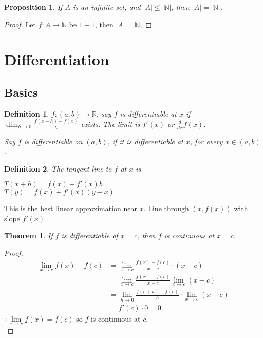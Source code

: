 \documentclass[12pt]{article}
\newcommand{\abs}[1]{\left| #1 \right|}
\theoremstyle{plain}
\newtheorem{theorem}{Theorem}[subsection]
\newtheorem{definition}{Definition}[subsection]
\newtheorem{proposition}{Proposition}[subsection]
\newcommand{\dlim}{\displaystyle\lim\limits}
\begin{document}
    \begin{proposition}
        If $A$ is an infinite set, and $\abs{A}\leq \abs{\mathbb{N}}$,
        then $\abs{A} = \abs{\mathbb{N}}$.
    \end{proposition}
    \begin{proof}
        Let $f:A\to\mathbb{N}$ be $1-1$, then $\abs{A}=\mathbb{N}$, 
    \end{proof}

    \newpage
\section{Differentiation}
    \subsection{Basics}
    \begin{definition}
        $f:(a,b)\to\mathbb{R}$, say  $f$ is differentiable at $x$ 
        if $\dim_{h\to 0} \frac{f(x+h)-f(x)}h$ exists. The limit is $f'(x)$
        or $\frac d{dx} f(x)$. 

        Say $f$ is differentiable on $(a,b)$, if it is differentiable at $x$,
         for every $x\in (a,b)$.\\
    \end{definition}
     
		\begin{definition}
			The tangent line to $f$ at $x$ is 
			\begin{center}
				$T(x+h) = f(x)+f'(x)h$\\
				$T(y) = f(x) + f'(x) (y-x)$
			\end{center}
		\end{definition}

    This is the best linear approximation near $x$. 
    Line through $(x, f(x))$ with slope $f'(x)$.\\

    \begin{theorem}
        If $f$ is differentiable of $x=c$, 
        then $f$ is continuous at $x=c$.
    \end{theorem}
     \begin{proof}
        \begin{align*}
				 \dlim_{x\to c} f(x)- f(c) 
					&= \dlim_{x\to c} \frac{f(x)-f(c)}{x-c}\cdot (x-c)\\
					&=\dlim_{x\to c} \frac{f(x)-f(c)}{x-c} \dlim_{x\to c}(x-c)\\
					&=\dlim_{h\to 0} \frac{f(c+h)-f(c)}h \cdot \dlim_{x\to c}(x-c)\\
					&=f'(c)\cdot 0 = 0
        \end{align*}
        $\therefore \dlim_{x\to c} f(x) = f(c)$ so $f$ is continuous at $c$. \\
    \end{proof}
\end{document}
